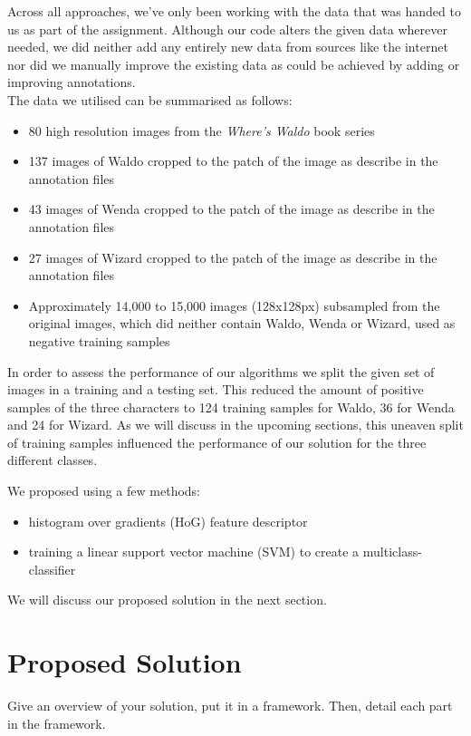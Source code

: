 \documentclass[11pt]{article}
\begin{document}
Across all approaches, we've only been working with the data that was handed to us as part of the assignment. Although our code alters the given data wherever needed, we did neither add any entirely new data from sources like the internet nor did we manually improve the existing data as could be achieved by adding or improving annotations.\\

The data we utilised can be summarised as follows:

\begin{itemize}
    \item 80 high resolution images from the \textit{Where's Waldo} book series
    \item 137 images of Waldo cropped to the patch of the image as describe in the annotation files
    \item 43 images of Wenda cropped to the patch of the image as describe in the annotation files
    \item 27 images of Wizard cropped to the patch of the image as describe in the annotation files
    \item Approximately 14,000 to 15,000 images (128x128px) subsampled from the original images, which did neither contain Waldo, Wenda or Wizard, used as negative training samples
\end{itemize}

In order to assess the performance of our algorithms we split the given set of images in a training and a testing set. This reduced the amount of positive samples of the three characters to 124 training samples for Waldo, 36 for Wenda and 24 for Wizard. As we will discuss in the upcoming sections, this uneaven split of training samples influenced the performance of our solution for the three different classes. 

We proposed using a few methods:

\begin{itemize}
    \item histogram over gradients (HoG) feature descriptor
    \item training a linear support vector machine (SVM) to create a multiclass-classifier
\end{itemize}

We will discuss our proposed solution in the next section.\\


\section{Proposed Solution}
Give an overview of your solution, put it in a framework. Then, detail each part in the framework.
\end{document}
